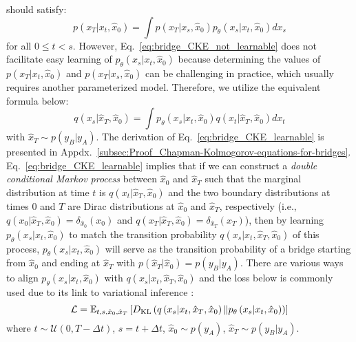 should satisfy:
\begin{equation}
p\left(x_{T}|x_{t},\hat{x}_{0}\right)=\int p\left(x_{T}|x_{s},\hat{x}_{0}\right)p_{\theta}\left(x_{s}|x_{t},\hat{x}_{0}\right)dx_{s}\label{eq:bridge_CKE_not_learnable}
\end{equation}
for all $0\leq t<s$. However, Eq.~\ref{eq:bridge_CKE_not_learnable}
does not facilitate easy learning of $p_{\theta}\left(x_{s}|x_{t},\hat{x}_{0}\right)$
because determining the values of $p\left(x_{T}|x_{t},\hat{x}_{0}\right)$
and $p\left(x_{T}|x_{s},\hat{x}_{0}\right)$ can be challenging in
practice, which usually requires another parameterized model. Therefore,
we utilize the equivalent formula below:
\begin{equation}
q\left(x_{s}|\hat{x}_{T},\hat{x}_{0}\right)=\int p_{\theta}\left(x_{s}|x_{t},\hat{x}_{0}\right)q\left(x_{t}|\hat{x}_{T},\hat{x}_{0}\right)dx_{t}\label{eq:bridge_CKE_learnable}
\end{equation}
with $\hat{x}_{T}\sim p\left(y_{B}|y_{A}\right)$. The derivation
of Eq.~\ref{eq:bridge_CKE_learnable} is presented in Appdx.~\ref{subsec:Proof_Chapman-Kolmogorov-equations-for-bridges}.
Eq.~\ref{eq:bridge_CKE_learnable} implies that if we can construct
a \emph{double conditional Markov process} between $\hat{x}_{0}$
and $\hat{x}_{T}$ such that the marginal distribution at time $t$
is $q\left(x_{t}|\hat{x}_{T},\hat{x}_{0}\right)$ and the two boundary
distributions at times $0$ and $T$ are Dirac distributions at $\hat{x}_{0}$
and $\hat{x}_{T}$, respectively (i.e., $q\left(x_{0}|\hat{x}_{T},\hat{x}_{0}\right)=\delta_{\hat{x}_{0}}\left(x_{0}\right)$
and $q\left(x_{T}|\hat{x}_{T},\hat{x}_{0}\right)=\delta_{\hat{x}_{T}}\left(x_{T}\right)$),
then by learning $p_{\theta}\left(x_{s}|x_{t},\hat{x}_{0}\right)$
to match the transition probability $q\left(x_{s}|x_{t},\hat{x}_{T},\hat{x}_{0}\right)$
of this process, $p_{\theta}\left(x_{s}|x_{t},\hat{x}_{0}\right)$
will serve as the transition probability of a bridge starting from
$\hat{x}_{0}$ and ending at $\hat{x}_{T}$ with $p\left(\hat{x}_{T}|\hat{x}_{0}\right)=p\left(y_{B}|y_{A}\right)$.
There are various ways to align $p_{\theta}\left(x_{s}|x_{t},\hat{x}_{0}\right)$
with $q\left(x_{s}|x_{t},\hat{x}_{T},\hat{x}_{0}\right)$ and the
loss below is commonly used due to its link to variational inference
\cite{ho2020denoising,LiX0L23}:
\begin{equation}
\mathcal{L}=\mathbb{E}_{t,s,\hat{x}_{0},\hat{x}_{T}}\left[D_{\text{KL}}\left(q\left(x_{s}|x_{t},\hat{x}_{T},\hat{x}_{0}\right)\|p_{\theta}\left(x_{s}|x_{t},\hat{x}_{0}\right)\right)\right]\label{eq:loss_bridge_1}
\end{equation}
where $t\sim\mathcal{U}\left(0,T-\Delta t\right)$, $s=t+\Delta t$,
$\hat{x}_{0}\sim p\left(y_{A}\right)$, $\hat{x}_{T}\sim p\left(y_{B}|y_{A}\right)$.

